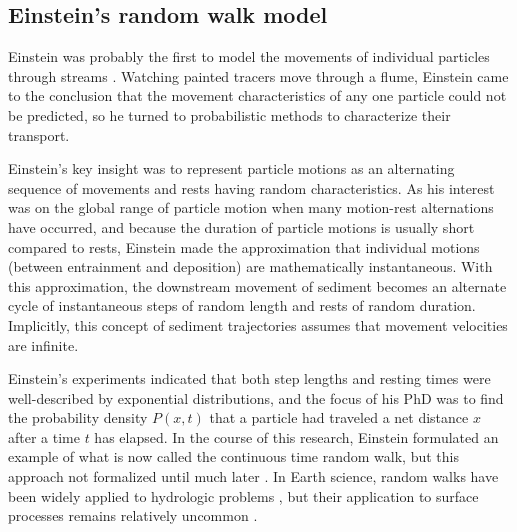 \subsection{Einstein's random walk model}
\label{sec:einwalk}
Einstein was probably the first to model the movements of individual particles through streams \citep{Einstein1937}.
Watching painted tracers move through a flume, Einstein came to the conclusion that the movement characteristics of any one particle could not be predicted, so he turned to probabilistic methods to characterize their transport.

Einstein's key insight was to represent particle motions as an alternating sequence of movements and rests having random characteristics.
As his interest was on the global range of particle motion when many motion-rest alternations have occurred, and because the duration of particle motions is usually short compared to rests, Einstein made the approximation that individual motions (between entrainment and deposition) are mathematically instantaneous.
With this approximation, the downstream movement of sediment becomes an alternate cycle of instantaneous steps of random length and rests of random duration. 
Implicitly, this concept of sediment trajectories assumes that movement velocities are infinite.

Einstein's experiments indicated that both step lengths and resting times were well-described by exponential distributions, and the focus of his PhD was to find the probability density $P(x,t)$ that a particle had traveled a net distance $x$ after a time $t$ has elapsed. In the course of this research, Einstein formulated an example of what is now called the continuous time random walk, but this approach not formalized until much later \citep{Montroll1965}. In Earth science, random walks have been widely applied to hydrologic problems \citep{Berkowitz2006}, but their application to surface processes remains relatively uncommon \citep[e.g.][]{Schumer2009}.

